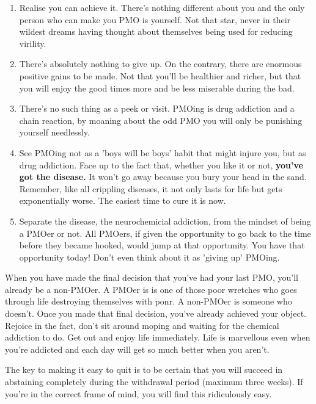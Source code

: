 \documentclass[easypeasy]{subfiles}
\begin{document}
\begin{enumerate}
  \item Realise you can achieve it. There's nothing different about you and the only person who can make you PMO is yourself. Not that star, never in their wildest dreams having thought about themselves being used for reducing virility.

  \item There's absolutely nothing to give up. On the contrary, there are enormous positive gains to be made. Not that you'll be healthier and richer, but that you will enjoy the good times more and be less miserable during the bad.

  \item There's no such thing as a peek or visit. PMOing is drug addiction and a chain reaction, by moaning about the odd PMO you will only be punishing yourself needlessly.

  \item See PMOing not as a 'boys will be boys' habit that might injure you, but as drug addiction. Face up to the fact that, whether you like it or not, \textbf{you've got the disease.} It won't go away because you bury your head in the sand. Remember, like all crippling diseases, it not only lasts for life but gets exponentially worse. The easiest time to cure it is now.

  \item Separate the disease, the neurochemicial addiction, from the mindset of being a PMOer or not. All PMOers, if given the opportunity to go back to the time before they became hooked, would jump at that opportunity. You have that opportunity today! Don't even think about it as 'giving up' PMOing.

\end{enumerate}

When you have made the final decision that you've had your last PMO, you'll already be a non-PMOer. A PMOer is is one of those poor wretches who goes through life destroying themselves with ponr. A non-PMOer is someone who doesn't. Once you made that final decision, you've already achieved your object. Rejoice in the fact, don't sit around moping and waiting for the chemical addiction to do. Get out and enjoy life immediately. Life is marvellous even when you're addicted and each day will get so much better when you aren't.

The key to making it easy to quit is to be certain that you will succeed in abstaining completely during the withdrawal period (maximum three weeks). If you're in the correct frame of mind, you will find this ridiculously easy.
\end{document}
